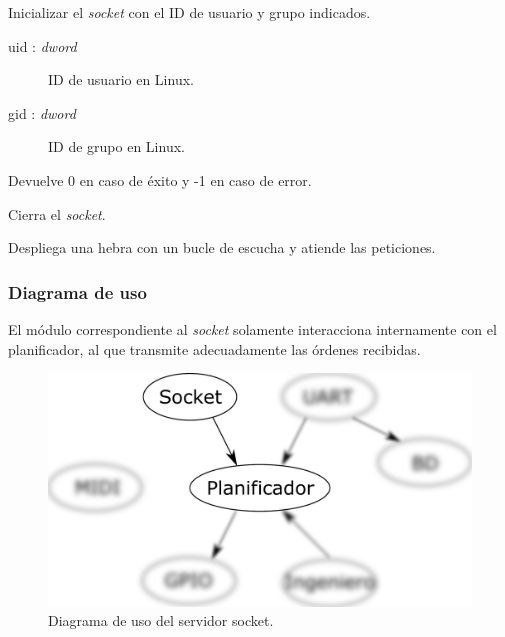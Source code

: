 \begin{description}[style=nextline]
	\item[socket\_init (uid, gid) : \textit{dword}]
	Inicializar el \textit{socket} con el ID de usuario y grupo indicados.
	
	\begin{description}
		\item[uid : \textit{dword}] ID de usuario en Linux.
		\item[gid : \textit{dword}] ID de grupo en Linux.
	\end{description}
	
	Devuelve 0 en caso de éxito y -1 en caso de error.
	
	\item[socket\_destroy ()]
	Cierra el \textit{socket}.
	
	\item[socket\_loop ()]
	Despliega una hebra con un bucle de escucha y atiende las peticiones.
	
\end{description}

\subsubsection{Diagrama de uso}

El módulo correspondiente al \textit{socket} solamente interacciona internamente con el planificador, al que transmite adecuadamente las órdenes recibidas.

\smallskip

\begin{figure}[H]
	\noindent \begin{centering}
		\includegraphics[width=\linewidth/2]{capitulo4/daemon_socket}
		\par\end{centering}
	\smallskip
	\caption{\label{fig:daemon_socket} Diagrama de uso del servidor socket.}
\end{figure} 

